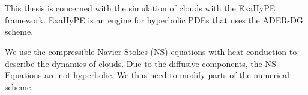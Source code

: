 \chapter{\abstractname}
This thesis is concerned with the simulation of clouds with the ExaHyPE framework.
ExaHyPE is an engine for hyperbolic PDEs that uses the ADER-DG scheme.

We use the compressible Navier-Stokes (NS) equations with heat conduction to describe the dynamics of clouds.
Due to the diffusive components, the NS-Equations are not hyperbolic.
We thus need to modify parts of the numerical scheme.

